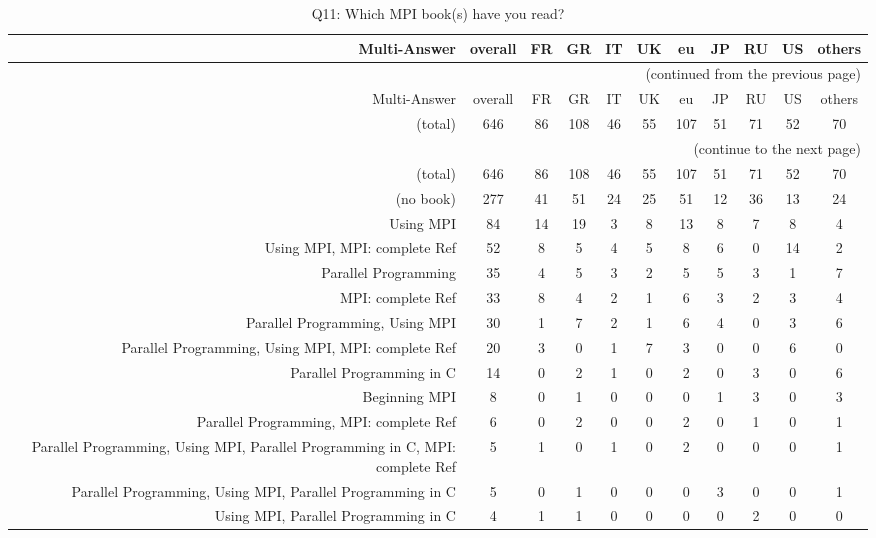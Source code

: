 \clearpage%
{\footnotesize\begin{landscape}%
\begin{longtable}[htb]{r|c|c|c|c|c|c|c|c|c|c}%
\caption{Q11: Which MPI book(s) have you read?}%
\label{tab:Q11-mans} \\%
\hline%
Multi-Answer & overall & FR & GR & IT & UK & eu & JP & RU & US & others \\
 \hline%
\endfirsthead%
\multicolumn{11}{r}{(continued from the previous page)}\\%
\hline%
Multi-Answer & overall & FR & GR & IT & UK & eu & JP & RU & US & others \\
 \hline%
\endhead%
\hline%
(total) & 646 & 86 & 108 & 46 & 55 & 107 & 51 & 71 & 52 & 70 \\%
\hline%
\multicolumn{11}{r}{(continue to the next page)}\\%
\endfoot%
\hline%
(total) & 646 & 86 & 108 & 46 & 55 & 107 & 51 & 71 & 52 & 70 \\%
\hline%
\endlastfoot%
\hline%
{(no book)} & 277 & 41 & 51 & 24 & 25 & 51 & 12 & 36 & 13 & 24 \\%
{Using MPI} & 84 & 14 & 19 & 3 & 8 & 13 & 8 & 7 & 8 & 4 \\%
{Using MPI, MPI: complete Ref} & 52 & 8 & 5 & 4 & 5 & 8 & 6 & 0 & 14 & 2 \\%
{Parallel Programming} & 35 & 4 & 5 & 3 & 2 & 5 & 5 & 3 & 1 & 7 \\%
{MPI: complete Ref} & 33 & 8 & 4 & 2 & 1 & 6 & 3 & 2 & 3 & 4 \\%
{Parallel Programming, Using MPI} & 30 & 1 & 7 & 2 & 1 & 6 & 4 & 0 & 3 & 6 \\%
{Parallel Programming, Using MPI, MPI: complete Ref} & 20 & 3 & 0 & 1 & 7 & 3 & 0 & 0 & 6 & 0 \\%
{Parallel Programming in C} & 14 & 0 & 2 & 1 & 0 & 2 & 0 & 3 & 0 & 6 \\%
{Beginning MPI} & 8 & 0 & 1 & 0 & 0 & 0 & 1 & 3 & 0 & 3 \\%
{Parallel Programming, MPI: complete Ref} & 6 & 0 & 2 & 0 & 0 & 2 & 0 & 1 & 0 & 1 \\%
{Parallel Programming, Using MPI, Parallel Programming in C, MPI: complete Ref} & 5 & 1 & 0 & 1 & 0 & 2 & 0 & 0 & 0 & 1 \\%
{Parallel Programming, Using MPI, Parallel Programming in C} & 5 & 0 & 1 & 0 & 0 & 0 & 3 & 0 & 0 & 1 \\%
{Using MPI, Parallel Programming in C} & 4 & 1 & 1 & 0 & 0 & 0 & 0 & 2 & 0 & 0 \\%

\end{longtable}
\end{landscape}}

